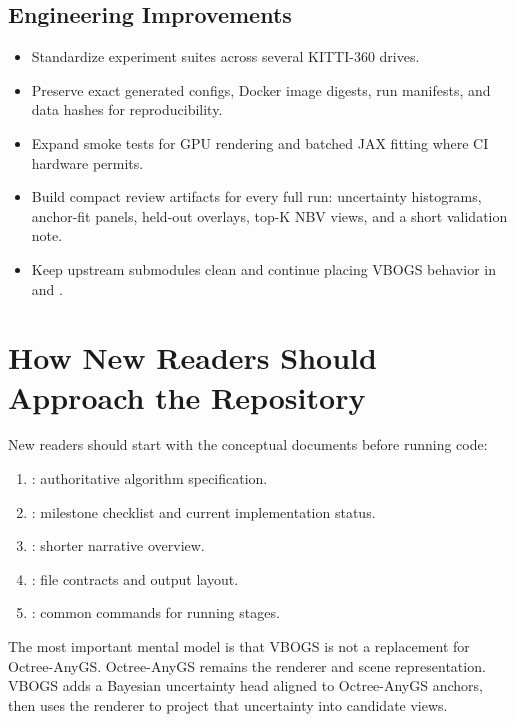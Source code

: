 \documentclass[11pt]{article}
\begin{document}
\subsection{Engineering Improvements}

\begin{itemize}
  \item Standardize experiment suites across several KITTI-360 drives.
  \item Preserve exact generated configs, Docker image digests, run manifests,
        and data hashes for reproducibility.
  \item Expand smoke tests for GPU rendering and batched JAX fitting where CI
        hardware permits.
  \item Build compact review artifacts for every full run: uncertainty
        histograms, anchor-fit panels, held-out overlays, top-K NBV views, and
        a short validation note.
  \item Keep upstream submodules clean and continue placing VBOGS behavior in
         and .
\end{itemize}

\section{How New Readers Should Approach the Repository}

New readers should start with the conceptual documents before running code:

\begin{enumerate}
  \item {}: authoritative algorithm
        specification.
  \item {}: milestone checklist and current implementation status.
  \item {}: shorter narrative
        overview.
  \item {}: file contracts and output layout.
  \item {}: common commands for running stages.
\end{enumerate}

The most important mental model is that VBOGS is not a replacement for
Octree-AnyGS. Octree-AnyGS remains the renderer and scene representation.
VBOGS adds a Bayesian uncertainty head aligned to Octree-AnyGS anchors, then
uses the renderer to project that uncertainty into candidate views.
\end{document}
